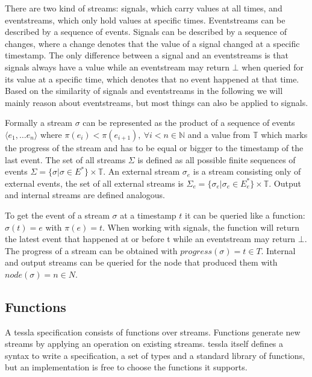 There are two kind of streams: signals, which carry values at all times, and event\-streams, which only hold values at specific times.
Eventstreams can be described by a sequence of events.
Signals can be described by a sequence of changes, where a change denotes that the value of a signal changed at a specific timestamp.
The only difference between a signal and an eventstreams is that signals always have a value while an eventstream may return \(\bot\) when queried for its value at a specific time, which denotes that no event happened at that time.
Based on the similarity of signals and eventstreams in the following we will mainly reason about eventstreams, but most things can also be applied to signals.

Formally a stream \(\sigma\) can be represented as the product of a sequence of events \(\langle e_1, \dots e_n\rangle\) where \(\pi(e_i) < \pi(e_{i+1}),\ \forall i < n \in \mathbb{N}\) and a value from \(\mathbb{T}\) which marks the progress of the stream and has to be equal or bigger to the timestamp of the last event.
The set of all streams \(\Sigma\) is defined as all possible finite sequences of events \(\Sigma = \{\sigma | \sigma \in E^* \} \times \mathbb{T}\).
An external stream \(\sigma_e\) is a stream consisting only of external events, the set of all external streams is \(\Sigma_e = \{\sigma_e | \sigma_e \in E_e^*\} \times \mathbb{T}\).
Output and internal streams are defined analogous.

To get the event of a stream \(\sigma\) at a timestamp \(t\) it can be queried like a function: \(\sigma(t) = e\) with \(\pi(e) = t \).
When working with signals, the function will return the latest event that happened at or before t while an eventstream may return \(\bot\).
The progress of a stream can be obtained with \(\mathit{progress}(\sigma) = t \in T\).
Internal and output streams can be queried for the node that produced them with \(\mathit{node}(\sigma) = n \in N\).

\subsection{Functions}
\label{sec:concepts:defs:functions}

A \gls{tessla} specification consists of functions over streams.
Functions generate new streams by applying an operation on existing streams.
\gls{tessla} itself defines a syntax to write a specification, a set of types and a standard library of functions, but an implementation is free to choose the functions it supports.

